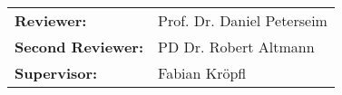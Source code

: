 {
	\vspace*{19.5cm}
	
	\Large{
	\def\arraystretch{1.2}
	\begin{tabular}{l l}
	
		\textbf{Reviewer:} & Prof. Dr. Daniel Peterseim \\
		\textbf{Second Reviewer:} & PD Dr. Robert Altmann \\
		\textbf{Supervisor:} & Fabian Kröpfl
	\end{tabular}
	}\par
	
	\def\arraystretch{1}
}
\restoregeometry
\pagebreak